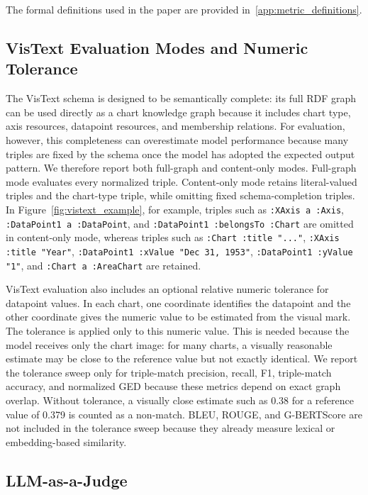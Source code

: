 \documentclass[preprint,12pt]{elsarticle}
\begin{document}
The formal definitions used in the paper are provided in~\ref{app:metric_definitions}.

\subsection{VisText Evaluation Modes and Numeric Tolerance}\label{subsec:vistext_eval_modes}

The VisText schema is designed to be semantically complete: its full RDF graph can be used directly as a chart knowledge graph because it includes chart type, axis resources, datapoint resources, and membership relations. For evaluation, however, this completeness can overestimate model performance because many triples are fixed by the schema once the model has adopted the expected output pattern. We therefore report both full-graph and content-only modes. Full-graph mode evaluates every normalized triple. Content-only mode retains literal-valued triples and the chart-type triple, while omitting fixed schema-completion triples. In Figure~\ref{fig:vistext_example}, for example, triples such as \texttt{:XAxis a :Axis}, \texttt{:DataPoint1 a :DataPoint}, and \texttt{:DataPoint1 :belongsTo :Chart} are omitted in content-only mode, whereas triples such as \texttt{:Chart :title "..."}, \texttt{:XAxis :title "Year"}, \texttt{:DataPoint1 :xValue "Dec 31, 1953"}, \texttt{:DataPoint1 :yValue "1"}, and \texttt{:Chart a :AreaChart} are retained.

VisText evaluation also includes an optional relative numeric tolerance for datapoint values. In each chart, one coordinate identifies the datapoint and the other coordinate gives the numeric value to be estimated from the visual mark. The tolerance is applied only to this numeric value. This is needed because the model receives only the chart image: for many charts, a visually reasonable estimate may be close to the reference value but not exactly identical. We report the tolerance sweep only for triple-match precision, recall, F1, triple-match accuracy, and normalized GED because these metrics depend on exact graph overlap. Without tolerance, a visually close estimate such as 0.38 for a reference value of 0.379 is counted as a non-match. BLEU, ROUGE, and G-BERTScore are not included in the tolerance sweep because they already measure lexical or embedding-based similarity.

\subsection{LLM-as-a-Judge}
\end{document}

